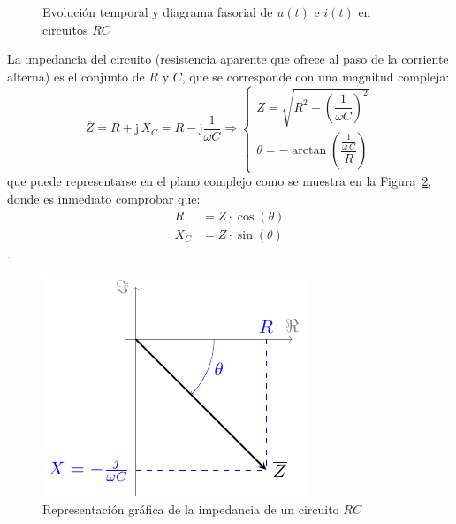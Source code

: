 \documentclass[11pt]{book} %
\numberwithin{dummy}{section}
\theoremstyle{ocrenumbox}
\theoremstyle{blacknumex}
\theoremstyle{blacknumbox}
\theoremstyle{ocrenum}
\newlength\esp
\begin{document}
	\begin{figure}[htbp]
		\centering
		\hfil
		\caption{Evolución temporal y diagrama fasorial de $u(t)$ e $i(t)$ en circuitos $RC$}
		\label{fig.fasorCapacitivoReal_VI}
	\end{figure}
	
	La impedancia del circuito (resistencia aparente que ofrece al paso de la corriente alterna) es el conjunto de $R$ y $C$, que se corresponde con una magnitud compleja: 
	\begin{equation}
		\boxed{ \overline{Z} = R + \mathrm{j}\,X_C = R- \mathrm{j}\dfrac{1}{\omega C} \Rightarrow 
			\begin{cases}
				Z=\sqrt{R^2-\left(\dfrac{1}{\omega C} \right)^2}\\
				\theta=-\arctan\left(\dfrac{\frac{1}{\omega\,C}}{R} \right)
		\end{cases}}
	\end{equation}
	que puede representarse en el plano complejo como se muestra en la Figura~\ref{fig.fasorcondensadorreal}, donde es inmediato comprobar que:
	\begin{align*}
		R&=Z\cdot\cos(\theta)\\
		X_C&=Z\cdot\sin(\theta)
	\end{align*}. 
	\begin{figure}[htbp]
		\centering
		\includegraphics{../figs/fasorCondensadorReal.pdf}
		\caption{Representación gráfica de la impedancia de un circuito $RC$}
		\label{fig.fasorcondensadorreal}
	\end{figure}
	
\end{document}
